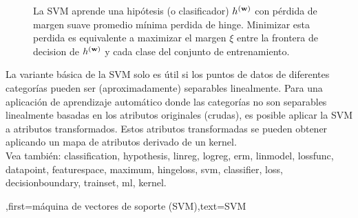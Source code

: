 {{\begin{figure}[H]
\begin{center}
				\caption{La SVM aprende una hipótesis (o clasificador) $h^{({\bf w})}$ con 
					pérdida de margen suave promedio mínima perdida de hinge. Minimizar esta perdida es equivalente
					a maximizar el margen $\xi$ entre la frontera de decision de $h^{({\bf w})}$ 
					y cada clase del conjunto de entrenamiento.}
				\label{fig_svm_gls_dict}
			\end{center}
		\end{figure}
		La variante básica de la SVM solo es útil si los puntos de datos de diferentes categorías pueden ser (aproximadamente)
		separables linealmente. Para una aplicación de aprendizaje automático donde las categorías no son separables linealmente basadas en los atributos
	    originales (crudas), es posible aplicar la SVM a atributos transformados.
		Estos atributos transformadas se pueden obtener aplicando un mapa de atributos derivado de un kernel.
		\\
		Vea también: \gls{classification}, \gls{hypothesis}, \gls{linreg}, \gls{logreg}, \gls{erm}, \gls{linmodel}, \gls{lossfunc}, \gls{datapoint}, \gls{featurespace}, \gls{maximum}, \gls{hingeloss}, \gls{svm}, \gls{classifier}, \gls{loss}, \gls{decisionboundary}, \gls{trainset}, \gls{ml}, \gls{kernel}.
		},first={máquina de vectores de soporte (SVM)},text={SVM} }

	

